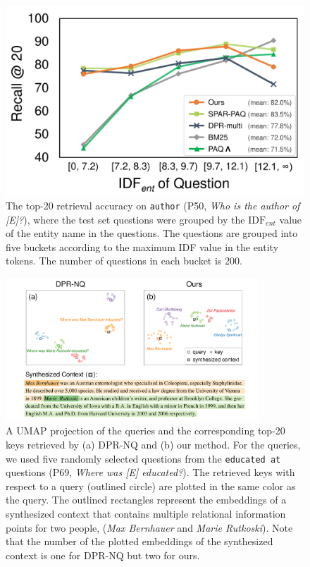 \documentclass[letterpaper]{article} %
\begin{document}
\begin{figure}
	\centering
	\includegraphics[width=\linewidth]{figures/idf_5_buckets.pdf}
	\caption{
		The top-20 retrieval accuracy on \texttt{\small author} (P50, \textit{Who is the author of [E]?}), where the test set questions were grouped by the $\mathrm{IDF}_{ent}$ value of the entity name in the questions.
		The questions are grouped into five buckets according to the maximum IDF value in the entity tokens.
		The number of questions in each bucket is 200.
	}
	\label{fig:idf}
\end{figure}


\begin{figure}[t]
	\centering
	\includegraphics[width=0.85\textwidth]{figures/embedding_umap.pdf}
	\caption{
		A UMAP projection of the queries and the corresponding top-20 keys retrieved by (a) DPR-NQ and (b) our method.
		For the queries, we used five randomly selected questions from the \texttt{\small educated at} questions (P69, \textit{Where was [E] educated?}).
		The retrieved keys with respect to a query (outlined circle) are plotted in the same color as the query.
		The outlined rectangles represent the embeddings of a synthesized context that contains multiple relational information points for two people, (\textit{Max Bernhauer} and \textit{Marie Rutkoski}).
		Note that the number of the plotted embeddings of the synthesized context is one for DPR-NQ but two for ours.
	}
	\label{fig:embedding_umap}
\end{figure}
\end{document}
